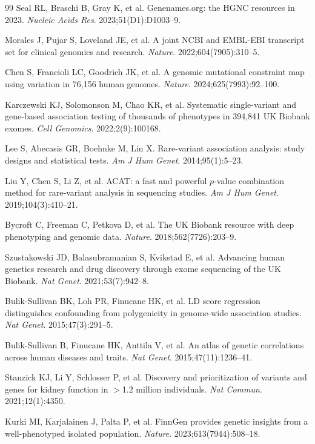\documentclass[11pt,a4paper]{article}
\begin{document}
\begin{thebibliography}{99}
 Seal RL, Braschi B, Gray K, et al. Genenames.org: the HGNC resources in
2023. \textit{Nucleic Acids Res}. 2023;51(D1):D1003--9.

 Morales J, Pujar S, Loveland JE, et al. A joint NCBI and EMBL-EBI
transcript set for clinical genomics and research. \textit{Nature}. 2022;604(7905):310--5.

 Chen S, Francioli LC, Goodrich JK, et al. A genomic mutational constraint
map using variation in 76,156 human genomes. \textit{Nature}. 2024;625(7993):92--100.

 Karczewski KJ, Solomonson M, Chao KR, et al. Systematic
single-variant and gene-based association testing of thousands of phenotypes in 394,841 UK
Biobank exomes. \textit{Cell Genomics}. 2022;2(9):100168.

 Lee S, Abecasis GR, Boehnke M, Lin X. Rare-variant association analysis:
study designs and statistical tests. \textit{Am J Hum Genet}. 2014;95(1):5--23.

 Liu Y, Chen S, Li Z, et al. ACAT: a fast and powerful $p$-value combination
method for rare-variant analysis in sequencing studies.
\textit{Am J Hum Genet}. 2019;104(3):410--21.

 Bycroft C, Freeman C, Petkova D, et al. The UK Biobank resource with
deep phenotyping and genomic data. \textit{Nature}. 2018;562(7726):203--9.

 Szustakowski JD, Balasubramanian S, Kvikstad E, et al. Advancing
human genetics research and drug discovery through exome sequencing of the UK Biobank.
\textit{Nat Genet}. 2021;53(7):942--8.

 Bulik-Sullivan BK, Loh PR, Finucane HK, et al. LD score regression
distinguishes confounding from polygenicity in genome-wide association studies.
\textit{Nat Genet}. 2015;47(3):291--5.

 Bulik-Sullivan B, Finucane HK, Anttila V, et al. An atlas of genetic
correlations across human diseases and traits. \textit{Nat Genet}. 2015;47(11):1236--41.

 Stanzick KJ, Li Y, Schlosser P, et al. Discovery and prioritization of
variants and genes for kidney function in $>$1.2 million individuals.
\textit{Nat Commun}. 2021;12(1):4350.

 Kurki MI, Karjalainen J, Palta P, et al. FinnGen provides genetic
insights from a well-phenotyped isolated population. \textit{Nature}. 2023;613(7944):508--18.


\end{thebibliography}
\end{document}
